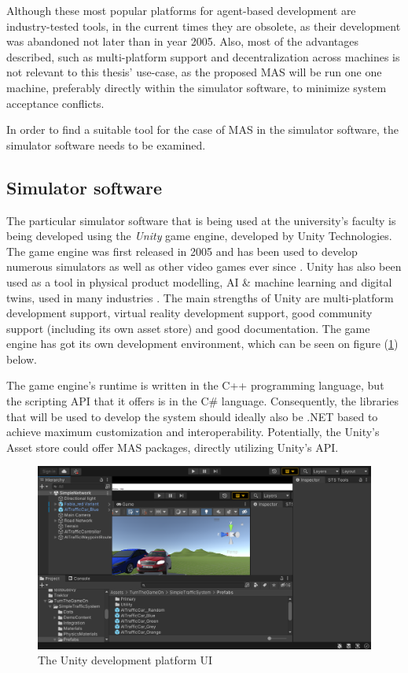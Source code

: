 \documentclass[main.tex]{subfiles}
\begin{document}
Although these most popular platforms for agent-based development are industry-tested tools, in the current 
times they are obsolete, as their development was abandoned not later than in year 2005. Also, most of the 
advantages described, such as multi-platform support and decentralization across machines is not relevant to 
this thesis' use-case, as the proposed MAS will be run one one machine, preferably directly within the simulator 
software, to minimize system acceptance conflicts. 

In order to find a suitable tool for the case of MAS in the simulator software, the simulator software needs to be examined.

\subsection{Simulator software}

The particular simulator software that is being used at the university's faculty is being
developed using the \emph{Unity} game engine, developed by Unity Technologies. The game engine
was first released in 2005 and has been used to develop numerous simulators as well as other
video games ever since \cite{UnityTechnologies2022}.  Unity has also been used as a tool in
physical product modelling, AI \& machine learning and digital twins, used in many industries
\cite{UnityTechnologies2022a}.  The main strengths of Unity are multi-platform development
support, virtual reality development support, good community support (including its own asset
store) and good documentation. The game engine has got its own development environment, which 
can be seen on figure (\ref{unity}) below.

The game engine's runtime is written in the C++ programming language, but the scripting API 
that it offers is in the C\# language. Consequently, the libraries that will be used to develop 
the system should ideally also be .NET based to achieve maximum customization and interoperability.
Potentially, the Unity's Asset store could offer MAS packages, directly utilizing Unity's API.

\begin{figure}[htbp]
    \centering
    \includegraphics[width=.9\textwidth]{unityUI.png}
    \caption{The Unity development platform UI}
    \label{unity}
\end{figure}
\end{document}
